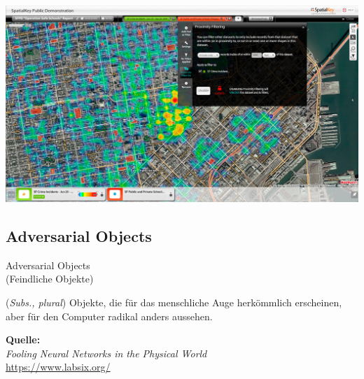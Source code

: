 \documentclass[aspectratio=169,x11names]{beamer}
\begin{document}
\begin{frame}
\begin{center}
\includegraphics[scale=0.3]{images/predictive_policing.jpg} 
\end{center}
\end{frame}


\subsection{Adversarial Objects}
\begin{frame}
\begin{center}
\huge
\glqq Adversarial Objects\grqq \\
\Large
(Feindliche Objekte)
\end{center}
\bigskip
\normalsize

(\textit{Subs., plural}) Objekte, die für das menschliche Auge herkömmlich erscheinen, aber für den Computer radikal anders aussehen.
\bigskip

\begin{center}
\textbf{Quelle:}\\
\emph{Fooling Neural Networks in the Physical World}\\
\url{https://www.labsix.org/}
\end{center}
\end{frame}
\end{document}
